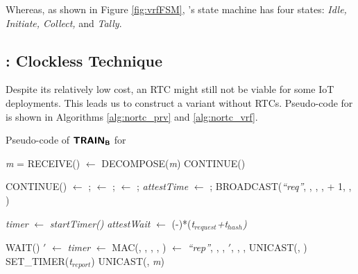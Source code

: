 Whereas, as shown in Figure \ref{fig:vrfFSM}, \vrf's state machine has four states: 
{\it Idle, Initiate, Collect,} and {\it Tally}.



\subsection{\trapsnortc: Clockless \sa Technique}\label{sec:two}

Despite its relatively low cost, an RTC might still not be viable for some IoT deployments. 
This leads us to construct a \system variant without RTCs.
Pseudo-code for \trapsnortc is shown in Algorithms \ref{alg:nortc_prv} and \ref{alg:nortc_vrf}.

\begin{algorithm}[hbt!]
\footnotesize
 \caption{Pseudo-code of $\boldsymbol{{\sf{TRAIN_{B}}}}$ for \prv}\label{alg:nortc_prv}
     \begin{algorithmic}[1]
         \State \textit{m} = RECEIVE()
             \State [\snd, \hashind, \hash, \height, \netheight, \attesttime] $\gets$ DECOMPOSE(\textit{m})
             \If {$\curhashind <= \hashind$}
                 \State CONTINUE() 
             \EndIf
             
                 \State CONTINUE()
             \EndIf
             \State \parent $\gets$ \snd; \curhashind $\gets$ \hashind; \curhash $\gets$ \hash; \textit{attestTime} $\gets$ \attesttime;
             \State BROADCAST(\textit{``req''}, \devid, \curhashind, \curhash, \height + 1, \netheight, \attesttime)
        
             \State \textit{timer} $\gets$ \textit{startTimer()} 
             \State \textit{attestWait} $\gets$ (\netheight-\height)*(\textit{t$_{request}$+\textit{t$_{hash}$})}
        
                 \State WAIT()
             \EndWhile
             \state \attesttime$'$ $\gets$ \textit{timer}
             \State \Authrep $\gets$ MAC(\key, \parent, \attesttime, \hash, {\lmt})
             \State \Attrep $\gets$ \textit{``rep''}, \devid, \parent, \attesttime$'$, \hash, {\lmt}, \Authrep
             \State UNICAST(\parent, \Attrep)
             \State SET\_TIMER(\height*\textit{t$_{report}$})
         \EndIf
                     \State UNICAST(\parent, \textit{m})
                \EndIf
        \EndIf
    \EndWhile
     \end{algorithmic}
 \end{algorithm}

